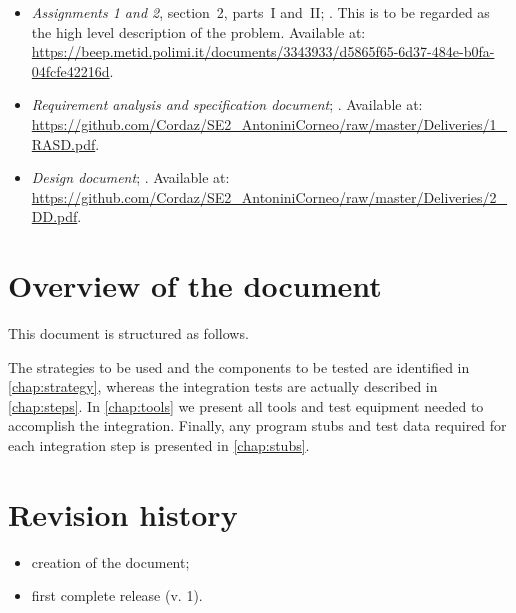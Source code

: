 \begin{itemize}
	\item \emph{Assignments 1 and 2}, section~2, parts~I and~II; . This is to be regarded as the high level description of the problem. Available at: \url{https://beep.metid.polimi.it/documents/3343933/d5865f65-6d37-484e-b0fa-04fcfe42216d}.
	
	\item \emph{Requirement analysis and specification document}; . Available at: \url{https://github.com/Cordaz/SE2_AntoniniCorneo/raw/master/Deliveries/1_RASD.pdf}.
	
	\item \emph{Design document}; . Available at: \url{https://github.com/Cordaz/SE2_AntoniniCorneo/raw/master/Deliveries/2_DD.pdf}.
\end{itemize}




\section{Overview of the document}
This document is structured as follows. 

The strategies to be used and the components to be tested are identified in \cref{chap:strategy}, whereas the integration tests are actually described in \cref{chap:steps}. In \cref{chap:tools} we present all tools and test equipment needed to accomplish the integration. Finally, any program stubs and test data required for each integration step is presented in \cref{chap:stubs}.



\section{Revision history}
\begin{itemize}
	\item {} creation of the document;
	\item {} first complete release (v. 1).
\end{itemize}




